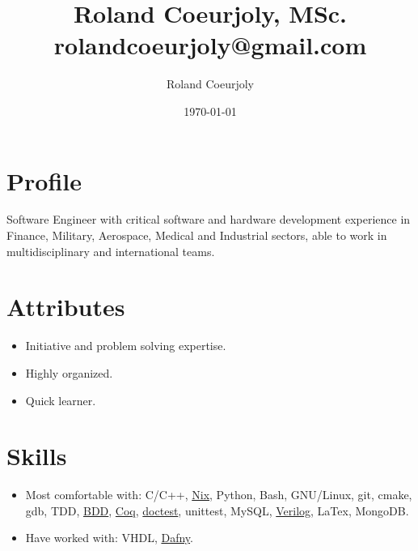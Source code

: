 \documentclass[11pt]{article}
\author{Roland Coeurjoly}
\date{\today}
\title{Roland Coeurjoly, MSc.\\\medskip
\large rolandcoeurjoly@gmail.com}
\begin{document}
\maketitle
\section*{Profile}
\label{sec:org67959b8}
Software Engineer with critical software and hardware development experience in Finance, Military, Aerospace, Medical and Industrial sectors, able to work in multidisciplinary and international teams.\\
\section*{Attributes}
\label{sec:org81d2cbc}
\begin{itemize}
\item Initiative and problem solving expertise.\\
\item Highly organized.\\
\item Quick learner.\\
\end{itemize}
\section*{Skills}
\label{sec:org5ca43a9}
\begin{itemize}
\item Most comfortable with: C/C++, \href{https://nixos.org/}{Nix}, Python, Bash, GNU/Linux, git, cmake, gdb, TDD, \href{https://www.agilealliance.org/glossary/bdd/}{BDD}, \href{https://coq.inria.fr/}{Coq}, \href{https://github.com/onqtam/doctest}{doctest}, unittest, MySQL, \href{https://github.com/RCoeurjoly/Space-Invaders}{Verilog}, LaTex, MongoDB.\\
\item Have worked with: VHDL, \href{https://dafny.org/}{Dafny}.\\
\end{itemize}
\end{document}

